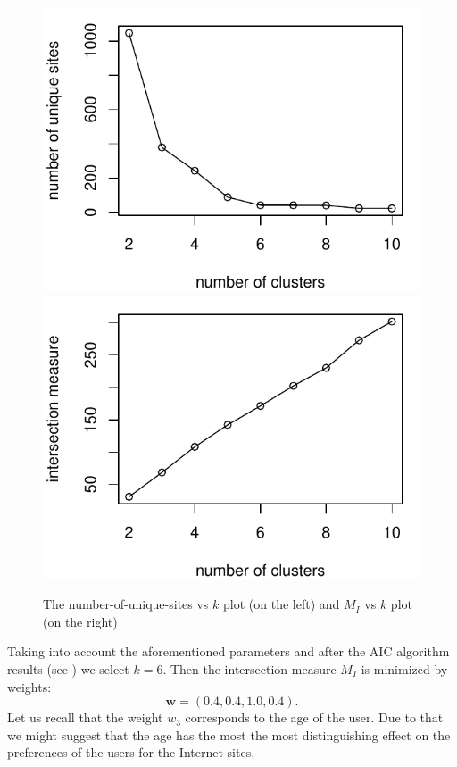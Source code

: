 \documentclass[runningheads,a4paper]{llncs}
\begin{document}
\begin{figure}

\includegraphics[scale=0.6]{fig_uurls.pdf}\hfill
\includegraphics[scale=0.6]{fig_meas.pdf}

\caption{The number-of-unique-sites vs $k$ plot (on the left) and $M_I$ vs $k$ plot (on the right)}
\label{N7Jti}
\end{figure}

Taking into account the aforementioned parameters and after the AIC algorithm results (see \cite{aic}) we select $k=6$. Then the intersection measure $M_I$ is minimized by weights:
\[
	\boldsymbol{w} = (0.4, 0.4, 1.0, 0.4).
\]
Let us recall that the weight $w_3$ corresponds to the age of the user. Due to that we might suggest that the age has the most the most distinguishing effect on the preferences of the users for the Internet sites.
\end{document}
